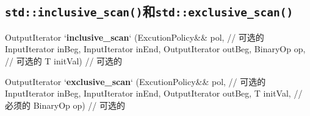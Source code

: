 \subsection{\texttt{std::inclusive\_scan()}和\texttt{std::exclusive\_scan()}}\label{ch23.2.3}
\begin{algolisting}
OutputIterator
`\textbf{inclusive\_scan}` (ExcutionPolicy&& pol,   // 可选的
                InputIterator inBeg, InputIterator inEnd,
                OutputIterator outBeg,
                BinaryOp op,            // 可选的
                T initVal)              // 可选的

OutputIterator
`\textbf{exclusive\_scan}` (ExcutionPolicy&& pol,   // 可选的
                InputIterator inBeg, InputIterator inEnd,
                OutputIterator outBeg,
                T initVal,              // 必须的
                BinaryOp op)            // 可选的
\end{algolisting}
